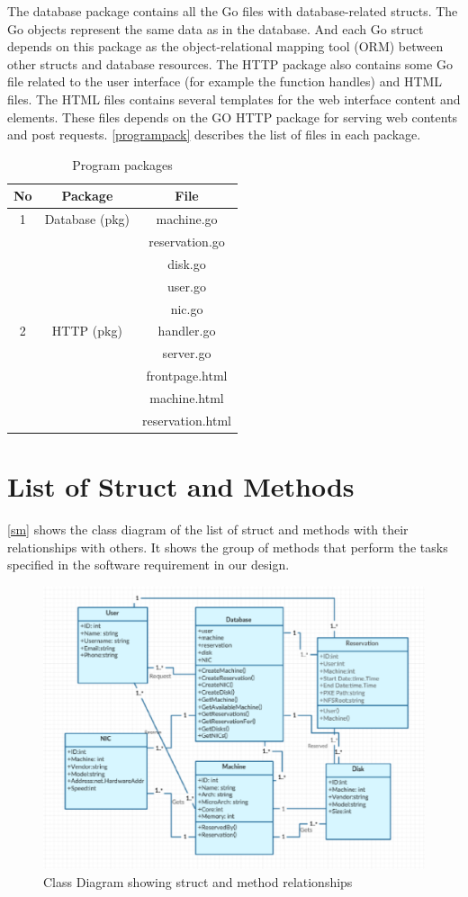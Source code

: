 The database package contains all the Go files with database-related structs. The Go objects represent the same data as in the database. And each Go struct depends on this package as the object-relational mapping tool (ORM) between other structs and database resources. The HTTP package also contains some Go file related to the user interface (for example the function handles) and HTML files. The HTML files contains several templates for the web interface content and elements. These files depends on the GO HTTP package for serving web contents and post requests. \autoref{programpack} describes the list of files in each package.
\pagebreak
\begin{table}[h!]
  \centering
  \begin{tabular}{ccc}
    \hline
    No & Package & File\\
   \hline
    1 &Database (pkg)& machine.go\\
       &&reservation.go\\
      &&disk.go\\
      &&user.go\\
      &&nic.go\\
    \hline
    2 &HTTP (pkg)& handler.go\\
    &&server.go\\
    &&frontpage.html\\
    &&machine.html\\
    &&reservation.html\\
    \hline
  \end{tabular}
  \caption{Program packages}
  \label{programpack}
\end{table}

\section{List of Struct and Methods}
\autoref{sm} shows the class diagram of the list of struct and methods with their relationships with others. It shows the group of methods that perform the tasks specified in the software requirement in our design.
\begin{figure}[h!]
\includegraphics[width = \linewidth]{methods.eps}
\caption{Class Diagram showing struct and method relationships}
\label{sm} 
\end{figure}
\pagebreak
